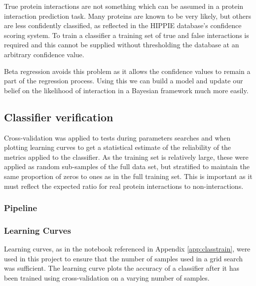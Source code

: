 True protein interactions are not something which can be assumed in a protein interaction prediction task.
Many proteins are known to be very likely, but others are less confidently classified, as reflected in the HIPPIE database's confidence scoring system\autocite{schaefer_hippie:_2012}.
To train a classifier a training set of true and false interactions is required and this cannot be supplied without thresholding the database at an arbitrary confidence value.

Beta regression avoids this problem as it allows the confidence values to remain a part of the regression process.
Using this we can build a model and update our belief on the likelihood of interaction in a Bayesian framework much more easily.

\subsection{Classifier verification}
\label{classifierverification}

%  


Cross-validation was applied to tests during parameters searches and when plotting learning curves to get a statistical estimate of the reliability of the metrics applied to the classifier\autocite[152]{witten_data_2011}.
As the training set is relatively large, these were applied as random sub-samples of the full data set, but stratified to maintain the same proportion of zeros to ones as in the full training set.
This is important as it must reflect the expected ratio for real protein interactions to non-interactions.

\subsubsection*{Pipeline}


\subsubsection*{Learning Curves}
Learning curves, as in the notebook referenced in Appendix \ref{app:classtrain}, were used in this project to ensure that the number of samples used in a grid search was sufficient.
The learning curve plots the accuracy of a classifier after it has been trained using cross-validation on a varying number of samples.


